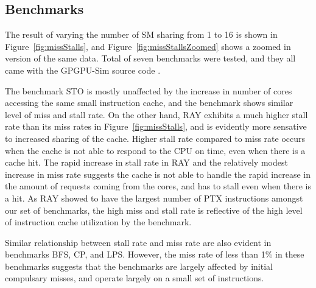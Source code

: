 

\subsection{Benchmarks}
\label{sec:benchmarks}
The result of varying the number of SM sharing from 1 to 16 is shown in Figure~\ref{fig:missStalls}, and Figure~\ref{fig:missStallsZoomed} shows 
a zoomed in version of the same data. Total of seven benchmarks were
tested, and they all came with the GPGPU-Sim source code \cite{bakhodayuan09}.

The benchmark STO is mostly unaffected by the increase in number of cores
accessing the same small instruction cache, and the benchmark shows similar
level of miss and stall rate. 
On the other hand, RAY exhibits a much higher stall rate than its miss rates in Figure~\ref{fig:missStalls}, 
and is evidently more sensative to increased sharing of the cache.
Higher stall rate compared to miss rate occurs when the cache is not able to 
respond to the CPU on time, even when there is a cache hit.
The rapid increase in stall rate in RAY and the relatively modest increase in miss rate 
suggests the cache is not able to handle the rapid increase in the amount of requests coming from the cores,
and has to stall even when there is a hit.
As RAY showed to have the largest number of PTX instructions amongst our set of benchmarks,
the high miss and stall rate is reflective of the high level of instruction cache utilization
by the benchmark. 

Similar relationship between stall rate and miss rate are also evident in 
benchmarks BFS, CP, and LPS. However, the miss rate of less than 1\% in these benchmarks
suggests that the benchmarks are largely affected by initial compulsary misses, and operate
largely on a small set of instructions.

